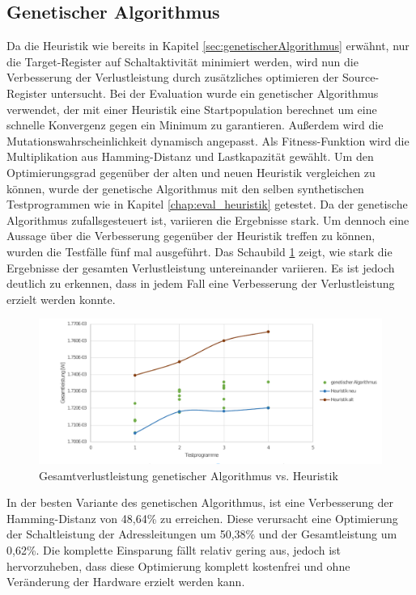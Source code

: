 \subsection{Genetischer Algorithmus}
Da die Heuristik wie bereits in Kapitel \ref{sec:genetischerAlgorithmus} erwähnt, nur die Target-Register auf Schaltaktivität minimiert werden, wird nun die Verbesserung der Verlustleistung durch zusätzliches optimieren der Source-Register untersucht.
Bei der Evaluation wurde ein genetischer Algorithmus verwendet, der mit einer Heuristik eine Startpopulation berechnet um eine schnelle Konvergenz gegen ein Minimum zu garantieren. Außerdem wird die Mutationswahrscheinlichkeit dynamisch angepasst. Als Fitness-Funktion wird die Multiplikation aus Hamming-Distanz und Lastkapazität gewählt. 
Um den Optimierungsgrad gegenüber der alten und neuen Heuristik vergleichen zu können, wurde der genetische Algorithmus mit den selben synthetischen Testprogrammen wie in Kapitel \ref{chap:eval_heuristik} getestet.
Da der genetische Algorithmus zufallsgesteuert ist, variieren die Ergebnisse stark. Um dennoch eine Aussage über die Verbesserung gegenüber der Heuristik treffen zu können, wurden die Testfälle fünf mal ausgeführt. Das Schaubild  \ref{fig:eval_genetic_total_power} zeigt, wie stark die Ergebnisse der gesamten Verlustleistung untereinander variieren. Es ist jedoch deutlich zu erkennen, dass in jedem Fall eine Verbesserung der Verlustleistung erzielt werden konnte.

\begin{figure}[H]
	\centering
	\includegraphics[width=\textwidth]{fig/gesamtleistung_genetik_heuristik.pdf}
	\caption{Gesamtverlustleistung genetischer Algorithmus vs. Heuristik}
	\label{fig:eval_genetic_total_power}
\end{figure}

In der besten Variante des genetischen Algorithmus, ist eine Verbesserung der Hamming-Distanz von 48,64\% zu erreichen. Diese verursacht eine Optimierung der Schaltleistung der Adressleitungen um 50,38\% und der Gesamtleistung um 0,62\%. Die komplette Einsparung fällt relativ gering aus, jedoch ist hervorzuheben, dass diese Optimierung komplett \glqq kostenfrei \grqq und ohne Veränderung der Hardware erzielt werden kann.

